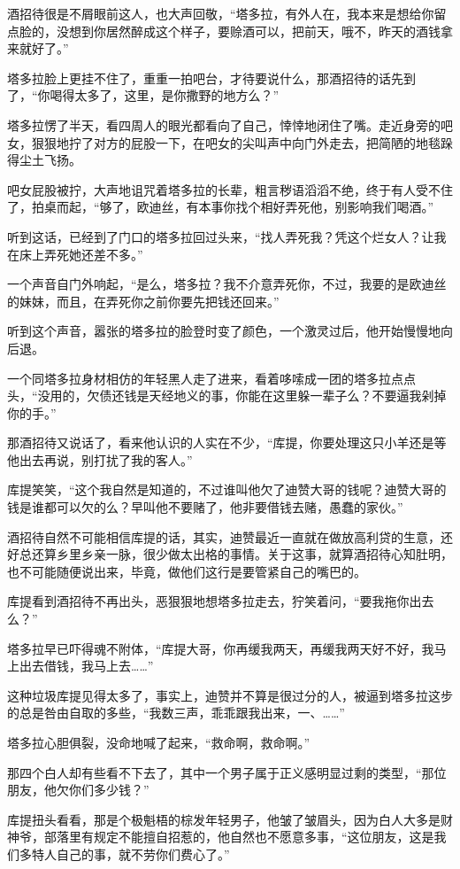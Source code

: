 酒招待很是不屑眼前这人，也大声回敬，“塔多拉，有外人在，我本来是想给你留点脸的，没想到你居然醉成这个样子，要赊酒可以，把前天，哦不，昨天的酒钱拿来就好了。”

塔多拉脸上更挂不住了，重重一拍吧台，才待要说什么，那酒招待的话先到了，“你喝得太多了，这里，是你撒野的地方么？”

塔多拉愣了半天，看四周人的眼光都看向了自己，悻悻地闭住了嘴。走近身旁的吧女，狠狠地拧了对方的屁股一下，在吧女的尖叫声中向门外走去，把简陋的地毯跺得尘土飞扬。

吧女屁股被拧，大声地诅咒着塔多拉的长辈，粗言秽语滔滔不绝，终于有人受不住了，拍桌而起，“够了，欧迪丝，有本事你找个相好弄死他，别影响我们喝酒。”

听到这话，已经到了门口的塔多拉回过头来，“找人弄死我？凭这个烂女人？让我在床上弄死她还差不多。”

一个声音自门外响起，“是么，塔多拉？我不介意弄死你，不过，我要的是欧迪丝的妹妹，而且，在弄死你之前你要先把钱还回来。”

听到这个声音，嚣张的塔多拉的脸登时变了颜色，一个激灵过后，他开始慢慢地向后退。

一个同塔多拉身材相仿的年轻黑人走了进来，看着哆嗦成一团的塔多拉点点头，“没用的，欠债还钱是天经地义的事，你能在这里躲一辈子么？不要逼我剁掉你的手。”

那酒招待又说话了，看来他认识的人实在不少，“库提，你要处理这只小羊还是等他出去再说，别打扰了我的客人。”

库提笑笑，“这个我自然是知道的，不过谁叫他欠了迪赞大哥的钱呢？迪赞大哥的钱是谁都可以欠的么？早叫他不要赌了，他非要借钱去赌，愚蠢的家伙。”

酒招待自然不可能相信库提的话，其实，迪赞最近一直就在做放高利贷的生意，还好总还算乡里乡亲一脉，很少做太出格的事情。关于这事，就算酒招待心知肚明，也不可能随便说出来，毕竟，做他们这行是要管紧自己的嘴巴的。

库提看到酒招待不再出头，恶狠狠地想塔多拉走去，狞笑着问，“要我拖你出去么？”

塔多拉早已吓得魂不附体，“库提大哥，你再缓我两天，再缓我两天好不好，我马上出去借钱，我马上去……”

这种垃圾库提见得太多了，事实上，迪赞并不算是很过分的人，被逼到塔多拉这步的总是咎由自取的多些，“我数三声，乖乖跟我出来，一、……”

塔多拉心胆俱裂，没命地喊了起来，“救命啊，救命啊。”

那四个白人却有些看不下去了，其中一个男子属于正义感明显过剩的类型，“那位朋友，他欠你们多少钱？”

库提扭头看看，那是个极魁梧的棕发年轻男子，他皱了皱眉头，因为白人大多是财神爷，部落里有规定不能擅自招惹的，他自然也不愿意多事，“这位朋友，这是我们多特人自己的事，就不劳你们费心了。”

